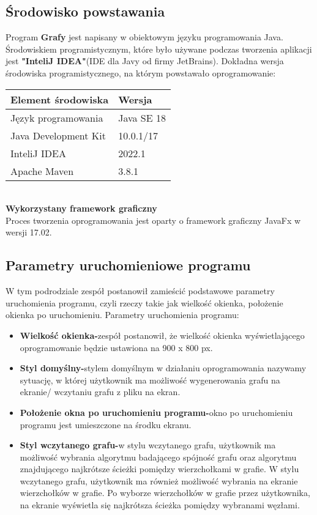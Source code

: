 \documentclass[10pt]{article}
\begin{document}
\subsection{Środowisko powstawania}
Program \textbf{Grafy} jest napisany w obiektowym języku programowania Java. Środowiskiem programistycznym, które było używane podczas tworzenia aplikacji jest \textbf{"InteliJ IDEA"}(IDE dla Javy od firmy JetBrains). Dokładna wersja środowiska programistycznego, na którym powstawało oprogramowanie:
\begin{table}[h!]
        \centering
        \footnotesize
        \begin{tabular}{p{4.5cm}|p{6cm}}
        \hline
        Element środowiska & Wersja \\
        \hline
        Język programowania & Java SE 18 \\
        \hline
        Java Development Kit & 10.0.1/17 \\
        \hline
        InteliJ IDEA & 2022.1 \\
        \hline
        Apache Maven & 3.8.1
\end{tabular}
\end{table}\\
\textbf{Wykorzystany framework graficzny} \\
Proces tworzenia oprogramowania jest oparty o framework graficzny JavaFx w wersji 17.02.
\subsection{Parametry uruchomieniowe programu}
W tym podrodziale zespół postanowił zamieścić podstawowe parametry uruchomienia programu, czyli rzeczy takie jak wielkość okienka, położenie okienka po uruchomieniu. Parametry uruchomienia programu:
\begin{itemize}
    \item \textbf{Wielkość okienka-}zespół postanowił, że wielkość okienka wyświetlającego oprogramowanie będzie ustawiona na 900 x 800 px.
    \item \textbf{Styl domyślny-}stylem domyślnym w działaniu oprogramowania nazywamy sytuację, w której użytkownik ma możliwość wygenerowania grafu na ekranie/ wczytaniu grafu z pliku na ekran. 
    \item \textbf{Położenie okna po uruchomieniu programu-}okno po uruchomieniu programu jest umieszczone na środku ekranu.
    \item \textbf{Styl wczytanego grafu-}w stylu wczytanego grafu, użytkownik ma możliwość wybrania algorytmu badającego spójność grafu oraz algorytmu znajdującego najkrótsze ścieżki pomiędzy wierzchołkami w grafie. W stylu wczytanego grafu, użytkownik ma również możliwość wybrania na ekranie wierzchołków w grafie. Po wyborze wierzchołków w grafie przez użytkownika, na ekranie wyświetla się najkrótsza ścieżka pomiędzy wybranami węzłami.
\end{itemize}
\newpage
\end{document}
